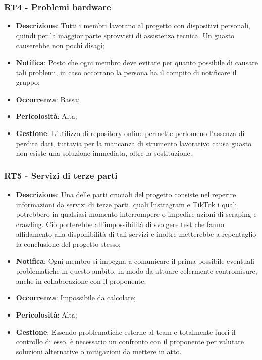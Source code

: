 	\subsubsection*{RT4 - Problemi hardware}
	\begin{itemize}
		\item \textbf{Descrizione}: Tutti i membri lavorano al progetto con dispositivi personali, quindi per la maggior parte sprovvisti di assistenza tecnica. Un guasto causerebbe non pochi disagi;
		\item \textbf{Notifica}: Posto che ogni membro deve evitare per quanto possibile di causare tali problemi, in caso occorrano la persona ha il compito di notificare il gruppo;
		\item \textbf{Occorrenza}: Bassa;
		\item \textbf{Pericolosità}: Alta;
		\item \textbf{Gestione}: L'utilizzo di repository online permette perlomeno l'assenza di perdita dati, tuttavia per la mancanza di strumento lavorativo causa guasto non esiste una soluzione immediata, oltre la sostituzione.
	\end{itemize}

	\subsubsection*{RT5 - Servizi di terze parti}
	\begin{itemize}
		\item \textbf{Descrizione}: Una delle parti cruciali del progetto consiste nel reperire informazioni da servizi di terze parti, quali Instragram e TikTok i quali potrebbero in qualsiasi momento interrompere o impedire azioni di scraping e crawling. Ciò porterebbe all'impossibilità di svolgere test che fanno affidamento alla disponibilità di tali servizi e inoltre metterebbe a repentaglio la conclusione del progetto stesso;
		\item \textbf{Notifica}: Ogni membro si impegna a comunicare il prima possibile eventuali problematiche in questo ambito, in modo da attuare celermente contromisure, anche in collaborazione con il proponente;
		\item \textbf{Occorrenza}: Impossibile da calcolare;
		\item \textbf{Pericolosità}: Alta;
		\item \textbf{Gestione}: Essendo problematiche esterne al team e totalmente fuori il controllo di esso, è necessario un confronto con il proponente per valutare soluzioni alternative o mitigazioni da mettere in atto.
	\end{itemize}

